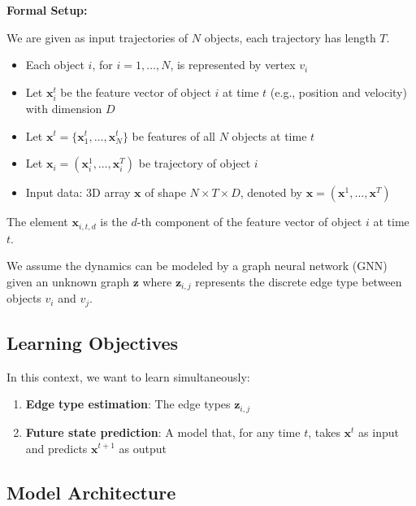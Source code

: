 \documentclass[11pt]{article}
\begin{document}
\begin{infobox}
\textbf{Formal Setup:}

We are given as input trajectories of $N$ objects, each trajectory has length $T$.

\begin{itemize}[leftmargin=*]
    \item Each object $i$, for $i=1,\ldots, N$, is represented by vertex $v_i$
    \item Let $\mathbf{x}_i^t$ be the feature vector of object $i$ at time $t$ (e.g., position and velocity) with dimension $D$
    \item Let $\mathbf{x}^t = \{\mathbf{x}_1^t, \ldots, \mathbf{x}_N^t\}$ be features of all $N$ objects at time $t$
    \item Let $\mathbf{x}_i = (\mathbf{x}_i^1, \ldots, \mathbf{x}_i^T)$ be trajectory of object $i$
    \item Input data: 3D array $\mathbf{x}$ of shape $N\times T \times D$, denoted by $\mathbf{x} = (\mathbf{x}^1, \ldots, \mathbf{x}^T)$
\end{itemize}

The element $\mathbf{x}_{i,t,d}$ is the $d$-th component of the feature vector of object $i$ at time $t$.
\end{infobox}

We assume the dynamics can be modeled by a graph neural network (GNN) given an unknown graph $\mathbf{z}$ where $\mathbf{z}_{i,j}$ represents the discrete edge type between objects $v_i$ and $v_j$.

\subsection{Learning Objectives}

In this context, we want to learn simultaneously:

\begin{enumerate}
	\item \textbf{Edge type estimation}: The edge types $\mathbf{z}_{i,j}$
	\item \textbf{Future state prediction}: A model that, for any time $t$, takes $\mathbf{x}^t$ as input and predicts $\mathbf{x}^{t+1}$ as output
\end{enumerate}

\subsection{Model Architecture}
\end{document}
